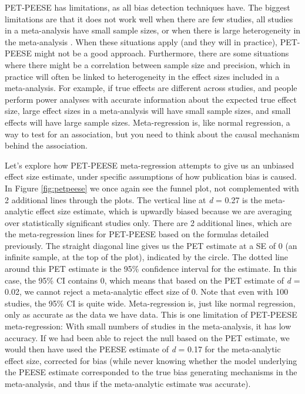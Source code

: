 \documentclass[
  oneside]{book}
\begin{document}
PET-PEESE has limitations, as all bias detection techniques have. The biggest limitations are that it does not work well when there are few studies, all studies in a meta-analysis have small sample sizes, or when there is large heterogeneity in the meta-analysis \citep{stanley_finding_2017}. When these situations apply (and they will in practice), PET-PEESE might not be a good approach. Furthermore, there are some situations where there might be a correlation between sample size and precision, which in practice will often be linked to heterogeneity in the effect sizes included in a meta-analysis. For example, if true effects are different across studies, and people perform power analyses with accurate information about the expected true effect size, large effect sizes in a meta-analysis will have small sample sizes, and small effects will have large sample sizes. Meta-regression is, like normal regression, a way to test for an association, but you need to think about the causal mechanism behind the association.

Let's explore how PET-PEESE meta-regression attempts to give us an unbiased effect size estimate, under specific assumptions of how publication bias is caused. In Figure \ref{fig:petpeese} we once again see the funnel plot, not complemented with 2 additional lines through the plots. The vertical line at \emph{d} = 0.27 is the meta-analytic effect size estimate, which is upwardly biased because we are averaging over statistically significant studies only. There are 2 additional lines, which are the meta-regression lines for PET-PEESE based on the formulas detailed previously. The straight diagonal line gives us the PET estimate at a SE of 0 (an infinite sample, at the top of the plot), indicated by the circle. The dotted line around this PET estimate is the 95\% confidence interval for the estimate. In this case, the 95\% CI contains 0, which means that based on the PET estimate of \emph{d} = 0.02, we cannot reject a meta-analytic effect size of 0. Note that even with 100 studies, the 95\% CI is quite wide. Meta-regression is, just like normal regression, only as accurate as the data we have data. This is one limitation of PET-PEESE meta-regression: With small numbers of studies in the meta-analysis, it has low accuracy. If we had been able to reject the null based on the PET estimate, we would then have used the PEESE estimate of \emph{d} = 0.17 for the meta-analytic effect size, corrected for bias (while never knowing whether the model underlying the PEESE estimate corresponded to the true bias generating mechanisms in the meta-analysis, and thus if the meta-analytic estimate was accurate).
\end{document}

